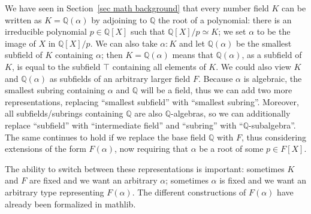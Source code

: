 \documentclass[a4paper,USenglish,cleveref, autoref, thm-restate]{lipics-v2021}
\newcommand{\lean}[1]{\texttt{#1}\xspace} %
\newcommand{\mathlib}{\textsf{mathlib}\xspace}
\newcommand{\Q}{\mathbb{Q}}
\begin{document}
We have seen in Section~\ref{sec math background} that every number field $K$ can be written as
$K=\Q(\alpha)$ by adjoining to $\Q$ the root of a polynomial: there is an irreducible polynomial $p \in \Q[X]$ such that $\Q[X] / p \simeq K$; we set $\alpha$ to be the image of $X$ in $\Q[X] / p$.
We can also take $\alpha : K$ and let $\Q(\alpha)$ be the smallest subfield of $K$ containing $\alpha$; %
then $K = \Q(\alpha)$ means that $\Q(\alpha)$, as a subfield of $K$, is equal to the subfield $\top$ containing all elements of $K$.
We could also view $K$ and $\Q(\alpha)$ as subfields of an arbitrary larger field $F$.
Because $\alpha$ is algebraic, the smallest subring containing $\alpha$ and $\Q$ will be a field, thus we can add two more representations, replacing ``smallest subfield'' with ``smallest subring''.
Moreover, all subfields/subrings containing $\Q$ are also $\Q$-algebras, so we can additionally replace ``subfield'' with ``intermediate field'' and ``subring'' with ``$\Q$-subalgebra''. The same continues to hold if we replace the base field $\Q$ with $F$, thus considering extensions of the form $F(\alpha)$, now requiring that $\alpha$ be a root of some $p\in F[X]$.

The ability to switch between these representations is important: sometimes $K$ and $F$ are fixed and we want an arbitrary $\alpha$; sometimes $\alpha$ is fixed and we want an arbitrary type representing $F(\alpha)$. The different constructions of $F(\alpha)$ have already been formalized in \mathlib.
\end{document}
